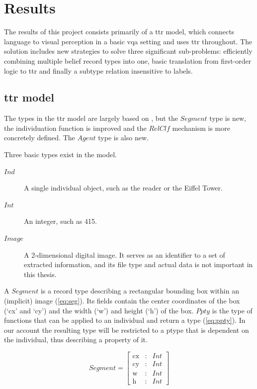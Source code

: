 \section{Results}
\label{sec:results}

The results of this project consists primarily of a \gls{ttr} model, which connects language to visual perception in a basic \gls{vqa} setting and uses \gls{ttr} throughout.
The solution includes new strategies to solve three significant sub-problems: efficiently combining multiple belief record types into one, basic translation from first-order logic to \gls{ttr} and finally a subtype relation insensitive to labels.



\subsection{\Acrshort{ttr} model}
\label{ssec:ttrmodel}

The types in the \gls{ttr} model are largely based on \cite{lspc}, but the $Segment$ type is new, the individuation function is improved and the $RelClf$ mechanism is more concretely defined.
The $Agent$ type is also new.

Three basic types exist in the model.

\begin{description}
\item [$Ind$] A single individual object, such as the reader or the Eiffel Tower.
\item [$Int$] An integer, such as 415.
\item [$Image$] A 2-dimensional digital image. It serves as an identifier to a set of extracted information, and its file type and actual data is not important in this thesis.
\end{description}

A $Segment$ is a record type describing a rectangular bounding box within an (implicit) image (\autoref{eq:seg}).
Its fields contain the center coordinates of the box (`cx' and `cy') and the width (`w') and height (`h') of the box.
$Ppty$ is the type of functions that can be applied to an individual and return a type (\autoref{eq:ppty}).
In our account the resulting type will be restricted to a ptype that is dependent on the individual, thus describing a property of it.

\begin{equation}\label{eq:seg}
Segment = \left[\begin{array}{rcl}
\text{cx} &:& Int\\
\text{cy} &:& Int\\
\text{w} &:& Int\\
\text{h} &:& Int
\end{array}\right]\end{equation}

